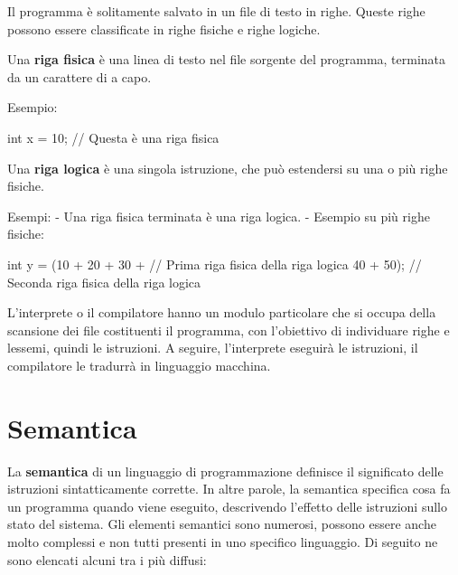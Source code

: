 \documentclass[
  letterpaper,
]{scrbook}
\newenvironment{Shaded}{\begin{snugshade}}{\end{snugshade}}
\newcommand{\CommentTok}[1]{\textcolor[rgb]{0.37,0.37,0.37}{#1}}
\newcommand{\DataTypeTok}[1]{\textcolor[rgb]{0.68,0.00,0.00}{#1}}
\newcommand{\DecValTok}[1]{\textcolor[rgb]{0.68,0.00,0.00}{#1}}
\newcommand{\NormalTok}[1]{\textcolor[rgb]{0.00,0.23,0.31}{#1}}
\newcommand{\OperatorTok}[1]{\textcolor[rgb]{0.37,0.37,0.37}{#1}}
\begin{document}
Il programma è solitamente salvato in un file di testo in righe. Queste
righe possono essere classificate in righe fisiche e righe logiche.

Una \textbf{riga fisica} è una linea di testo nel file sorgente del
programma, terminata da un carattere di a capo.

Esempio:

\begin{Shaded}
\begin{Highlighting}[]
\DataTypeTok{int}\NormalTok{ x }\OperatorTok{=} \DecValTok{10}\OperatorTok{;} \CommentTok{// Questa è una riga fisica}
\end{Highlighting}
\end{Shaded}

Una \textbf{riga logica} è una singola istruzione, che può estendersi su
una o più righe fisiche.

Esempi: - Una riga fisica terminata è una riga logica. - Esempio su più
righe fisiche:

\begin{Shaded}
\begin{Highlighting}[]
\DataTypeTok{int}\NormalTok{ y }\OperatorTok{=} \OperatorTok{(}\DecValTok{10} \OperatorTok{+} \DecValTok{20} \OperatorTok{+} \DecValTok{30} \OperatorTok{+} \CommentTok{// Prima riga fisica della riga logica}
         \DecValTok{40} \OperatorTok{+} \DecValTok{50}\OperatorTok{);} \CommentTok{// Seconda riga fisica della riga logica}
\end{Highlighting}
\end{Shaded}

L'interprete o il compilatore hanno un modulo particolare che si occupa
della scansione dei file costituenti il programma, con l'obiettivo di
individuare righe e lessemi, quindi le istruzioni. A seguire,
l'interprete eseguirà le istruzioni, il compilatore le tradurrà in
linguaggio macchina.

\section{Semantica}\label{semantica}

La \textbf{semantica} di un linguaggio di programmazione definisce il
significato delle istruzioni sintatticamente corrette. In altre parole,
la semantica specifica cosa fa un programma quando viene eseguito,
descrivendo l'effetto delle istruzioni sullo stato del sistema. Gli
elementi semantici sono numerosi, possono essere anche molto complessi e
non tutti presenti in uno specifico linguaggio. Di seguito ne sono
elencati alcuni tra i più diffusi:
\end{document}
